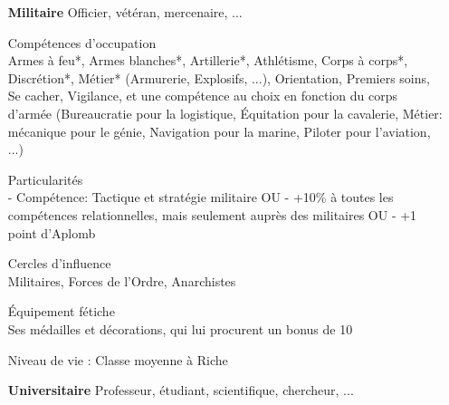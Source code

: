 \documentclass[11pt,twoside,a4paper]{article}
\begin{document}
\begin{multicols*}{2}
\begin{itemize}
	Comp{\'e}tences d'occupation~\\
	Biblioth{\`e}que, Contacts \& Ressources, Cr{\'e}dit, Hypnose, Langues (Latin), M{\'e}decine, Premiers Soins, Psychanalyse, Psychologie, Sciences de la vie*, Trouver Objet Cach{\'e}
	
	Particularit{\'e}s~\\
	- Comp{\'e}tence: R{\'e}conforter autrui OU
	- +10\% {\`a} la comp{\'e}tence pour r{\'e}sister {\`a} toutes les maladies, microbes, et autres vecteurs contagieux OU
	- +1 point d'Aplomb
	
	Cercles d'influence~\\
	Sant{\'e}, Notables, Anarchistes
	
	{\'E}quipement f{\'e}tiche~\\
	Son cabinet personnel avec son {\'e}quipement et ses ouvrages de r{\'e}f{\'e}rence qui lui procurent un bonus de 10%
	
	Niveau de vie : 
	Ais{\'e} {\`a} Riche

	\item[\textbf{Militaire}] Officier, v{\'e}t{\'e}ran, mercenaire, ...
	
	Comp{\'e}tences d'occupation~\\
	Armes {\`a} feu*, Armes blanches*, Artillerie*, Athl{\'e}tisme, Corps {\`a} corps*, Discr{\'e}tion*, M{\'e}tier* (Armurerie, Explosifs, ...), Orientation, Premiers soins, Se cacher, Vigilance, et une comp{\'e}tence au choix en fonction du corps d'arm{\'e}e (Bureaucratie pour la logistique, {\'E}quitation pour la cavalerie, M{\'e}tier: m{\'e}canique pour le g{\'e}nie, Navigation pour la marine, Piloter pour l'aviation, ...)
	
	Particularit{\'e}s~\\
	- Comp{\'e}tence: Tactique et strat{\'e}gie militaire OU
	- +10\% {\`a} toutes les comp{\'e}tences relationnelles, mais seulement aupr{\`e}s des militaires OU
	- +1 point d'Aplomb
	
	Cercles d'influence~\\
	Militaires, Forces de l'Ordre, Anarchistes
	
	{\'E}quipement f{\'e}tiche~\\
	Ses m{\'e}dailles et d{\'e}corations, qui lui procurent un bonus de 10%
	
	Niveau de vie : 
	Classe moyenne {\`a} Riche

	\item[\textbf{Universitaire}] Professeur, {\'e}tudiant, scientifique, chercheur, ...
	

\end{itemize}
\end{multicols*}
\end{document}
